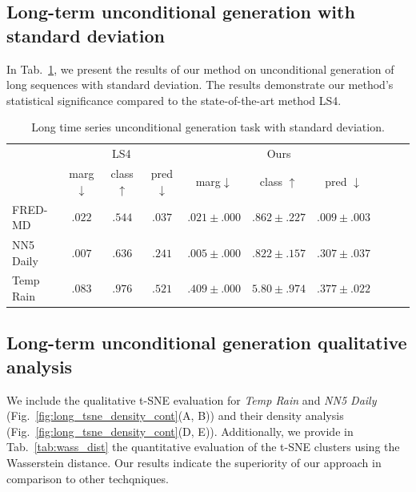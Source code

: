 \documentclass{article}
\begin{document}
\subsection{Long-term unconditional generation with standard deviation}
\label{app:additional_exp:long_ts_uncond_with_std}

In Tab.~\ref{tab:long_uncond_with_std}, we present the results of our method on unconditional generation of long sequences with standard deviation. The results demonstrate our method's statistical significance compared to the state-of-the-art method LS4. 


\begin{table}[!h]
    \centering
    \caption{Long time series unconditional generation task with standard deviation.}
    \label{tab:long_uncond_with_std}
    \setlength{\tabcolsep}{3.4pt}
    \begin{tabular}{l|c|c|c|c|c|c|c|c|c}
        \toprule
         & \multicolumn{3}{c|}{LS4} & \multicolumn{3}{c|}{Ours} \\ 
         & marg$\downarrow$ & class $\uparrow$ & pred $\downarrow$ & marg$\downarrow$ & class $\uparrow$ & pred $\downarrow$ \\
        \midrule
        FRED-MD & $.022$& $.544$ & $.037$ & $\boldsymbol{.021\pm.000}$ & $\boldsymbol{.862\pm.227}$ & $\boldsymbol{.009 \pm .003}$  \\
        NN5 Daily & $.007$ & $.636$ & $\boldsymbol{.241}$ & $\boldsymbol{.005 \pm .000}$ & $\boldsymbol{.822 \pm .157}$ & $.307 \pm .037$   \\
        Temp Rain & $\boldsymbol{.083}$ & $.976$ & $.521$ & $.409 \pm .000$ & $\boldsymbol{5.80 \pm .974}$ & $\boldsymbol{.377 \pm .022}$  \\
        \bottomrule
    \end{tabular}
\end{table}



\subsection{Long-term unconditional generation qualitative analysis}

We include the qualitative t-SNE evaluation for \textit{Temp Rain} and \textit{NN5 Daily} (Fig.~\ref{fig:long_tsne_density_cont}(A, B)) and their density analysis (Fig.~\ref{fig:long_tsne_density_cont}(D, E)). Additionally, we provide in Tab.~\ref{tab:wass_dist} the quantitative evaluation of the t-SNE clusters using the Wasserstein distance. Our results indicate the superiority of our approach in comparison to other techqniques.
\end{document}
